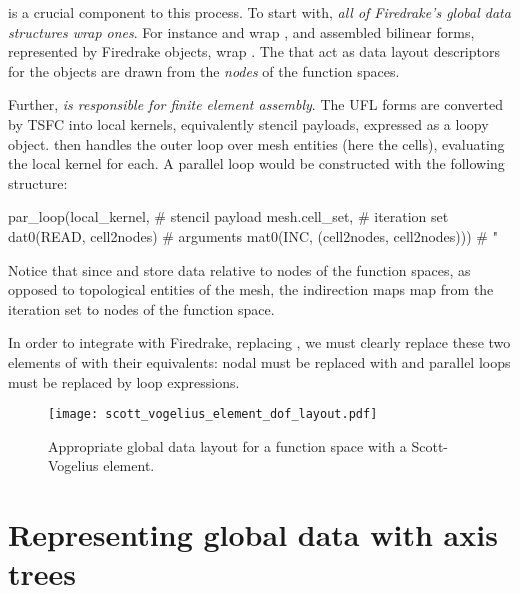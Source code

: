 \documentclass[thesis]{subfiles}
\begin{document}
 is a crucial component to this process.
To start with, \emph{all of Firedrake's global data structures wrap  ones}.
For instance  and  wrap  , and assembled bilinear forms, represented by Firedrake  objects, wrap  .
The  that act as data layout descriptors for the  objects are drawn from the \emph{nodes} of the function spaces.

Further, \emph{ is responsible for finite element assembly}.
The UFL forms are converted by TSFC into local kernels, equivalently stencil payloads, expressed as a loopy  object.
 then handles the outer loop over mesh entities (here the cells), evaluating the local kernel for each.
A parallel loop would be constructed with the following structure:
\begin{pyinline}
  par_loop(local_kernel,                         # stencil payload
           mesh.cell_set,                        # iteration set
           dat0(READ, cell2nodes)                # arguments
           mat0(INC, (cell2nodes, cell2nodes)))  #   "
\end{pyinline}
Notice that since  and  store data relative to nodes of the function spaces, as opposed to topological entities of the mesh, the indirection maps map from the iteration set to nodes of the function space.

In order to integrate  with Firedrake, replacing , we must clearly replace these two elements of  with their  equivalents: nodal  must be replaced with  and  parallel loops must be replaced by  loop expressions.

\begin{figure}
  \centering
  \texttt{[image: scott\_vogelius\_element\_dof\_layout.pdf]}
  \caption{
    Appropriate global data layout for a function space with a Scott-Vogelius element.
  }
  \label{fig:firedrake_data_tree}
\end{figure}

\section{Representing global data with axis trees}
\end{document}
